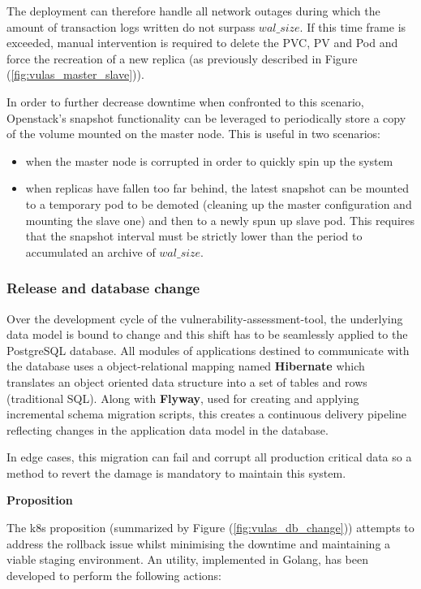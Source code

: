 \documentclass[11pt]{article}
\begin{document}
The deployment can therefore handle all network outages during which the amount of transaction logs written do not surpass $wal\_size$. If this time frame is exceeded, manual intervention is required to delete the PVC, PV and Pod and force the recreation of a new replica (as previously described in Figure (\ref{fig:vulas_master_slave})). 

In order to further decrease downtime when confronted to this scenario, Openstack's snapshot functionality can be leveraged to periodically store a copy of the volume mounted on the master node. This is useful in two scenarios:
\begin{itemize}
    \item when the master node is corrupted in order to quickly spin up the system
    \item when replicas have fallen too far behind, the latest snapshot can be mounted to a temporary pod to be demoted (cleaning up the master configuration and mounting the slave one) and then to a newly spun up slave pod. This requires that the snapshot interval must be strictly lower than the period to accumulated an archive of $wal\_size$.
\end{itemize} 

\subsubsection{Release and database change}

\hspace{5mm} Over the development cycle of the vulnerability-assessment-tool, the underlying data model is bound to change and this shift has to be seamlessly applied to the PostgreSQL database. All modules of applications destined to communicate with the database uses a object-relational mapping named \textbf{Hibernate} which translates an object oriented data structure into a set of tables and rows (traditional SQL). Along with \textbf{Flyway}, used for creating and applying incremental schema migration scripts, this creates a continuous delivery pipeline reflecting changes in the application data model in the database. 

In edge cases, this migration can fail and corrupt all production critical data so a method to revert the damage is mandatory to maintain this system. 

\textbf{Proposition}

The k8s proposition (summarized by Figure (\ref{fig:vulas_db_change})) attempts to address the rollback issue whilst minimising the downtime and maintaining a viable staging environment. An utility, implemented in Golang, has been developed to perform the following actions:
\end{document}
